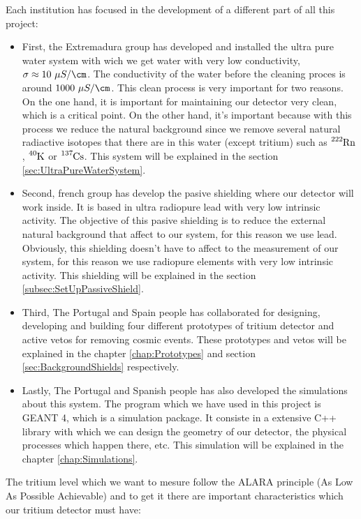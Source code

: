 Each institution has focused in the development of a different part of all this project:
\begin{itemize}
\item{} First, the Extremadura group has developed and installed the ultra pure water system with wich we get water with very low conductivity, $\sigma \approx 10 ~\mu S / \cm$. The conductivity of the water before the cleaning proces is around $ 1000 ~\mu S / \cm$. This clean process is very important for two reasons. On the one hand, it is important for maintaining our detector very clean, which is a critical point. On the other hand, it's important because with this process we reduce the natural background since we remove several natural radiactive isotopes that there are in this water (except tritium) such as $\ce{^{222}Rn}$, $\ce{^{40}K}$ or $\ce{^{137}Cs}$. This system will be explained in the section \ref{sec:UltraPureWaterSystem}.

\item{} Second, french group has develop the pasive shielding where our detector will work inside. It is based in ultra radiopure lead with very low intrinsic activity. The objective of this pasive shielding is to reduce the external natural background that affect to our system, for this reason we use lead. Obviously, this shielding doesn't have to affect to the measurement of our system, for this reason we use radiopure elements with very low intrinsic activity. This shielding will be explained in the section \ref{subsec:SetUpPassiveShield}.

\item{} Third, The Portugal and Spain people has collaborated for designing, developing and building four different prototypes of tritium detector and active vetos for removing cosmic events. These prototypes and vetos will be explained in the chapter \ref{chap:Prototypes} and section \ref{sec:BackgroundShields} respectively.

\item{} Lastly, The Portugal and Spanish people has also developed the simulations about this system. The program which we have used in this project is GEANT 4, which is a simulation package. It consiste in a extensive C++ library with which we can design the geometry of our detector, the physical processes which happen there, etc. This simulation will be explained in the chapter \ref{chap:Simulations}.

\end{itemize}

The tritium level which we want to mesure follow the ALARA principle (As Low As Possible Achievable) and to get it there are important characteristics which our tritium detector must have:

